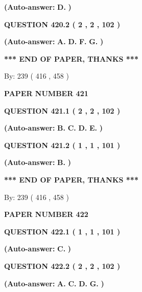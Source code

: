 \documentclass[12pt]{article}
\begin{document}
 
{\textbf{(Auto-answer:}}
{\textbf{\large{
D.}}}
{\textbf{)}}
 
 
  
  
{\textbf{\large{QUESTION
420.2 
 ( 2 , 2 , 102 )
}}}
 
 
{\textbf{(Auto-answer:}}
{\textbf{\large{
A.}}}
{\textbf{\large{
D.}}}
{\textbf{\large{
F.}}}
{\textbf{\large{
G.}}}
{\textbf{)}}
 
 
   
   
\vspace{1.0in} 
{\textbf{\large{ *** END OF PAPER, THANKS *** }}} 
   
   
\hspace{1.0in} By: 
 239 ( 416 ,  458 )
   
   
   
   
\newpage 
\setcounter{page}{ 
   421001 } 
   
   
 {\textbf{ \Large{ PAPER NUMBER  421  }}}
   
   
  
  
{\textbf{\large{QUESTION
421.1 
 ( 2 , 2 , 102 )
}}}
 
 
{\textbf{(Auto-answer:}}
{\textbf{\large{
B.}}}
{\textbf{\large{
C.}}}
{\textbf{\large{
D.}}}
{\textbf{\large{
E.}}}
{\textbf{)}}
 
 
  
  
{\textbf{\large{QUESTION
421.2 
 ( 1 , 1 , 101 )
}}}
 
 
{\textbf{(Auto-answer:}}
{\textbf{\large{
B.}}}
{\textbf{)}}
 
 
   
   
\vspace{1.0in} 
{\textbf{\large{ *** END OF PAPER, THANKS *** }}} 
   
   
\hspace{1.0in} By: 
 239 ( 416 ,  458 )
   
   
   
   
\newpage 
\setcounter{page}{ 
   422001 } 
   
   
 {\textbf{ \Large{ PAPER NUMBER  422  }}}
   
   
  
  
{\textbf{\large{QUESTION
422.1 
 ( 1 , 1 , 101 )
}}}
 
 
{\textbf{(Auto-answer:}}
{\textbf{\large{
C.}}}
{\textbf{)}}
 
 
  
  
{\textbf{\large{QUESTION
422.2 
 ( 2 , 2 , 102 )
}}}
 
 
{\textbf{(Auto-answer:}}
{\textbf{\large{
A.}}}
{\textbf{\large{
C.}}}
{\textbf{\large{
D.}}}
{\textbf{\large{
G.}}}
{\textbf{)}}
 
\end{document}
